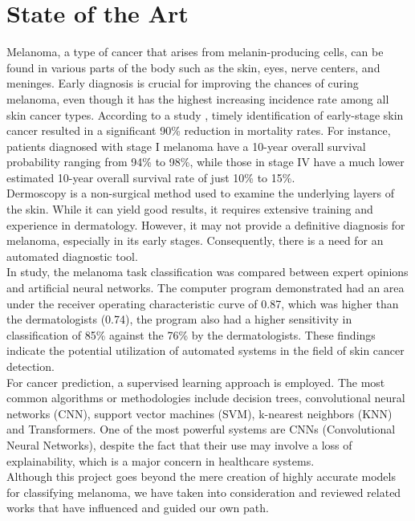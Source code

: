 \chapter{State of the Art}
\label{cap:estat}

Melanoma, a type of cancer that arises from melanin-producing cells, can be
found in various parts of the body such as the skin, eyes, nerve centers, and
meninges. Early diagnosis is crucial for improving the chances of curing
melanoma, even though it has the highest increasing incidence rate among all
skin cancer types. According to a study \cite{TimelyMelanomaDetection}, timely
identification of early-stage skin cancer resulted in a significant 90\%
reduction in mortality rates. For instance, patients diagnosed with stage I
melanoma have a 10-year overall survival probability ranging from 94\% to 98\%,
while those in stage IV have a much lower estimated 10-year overall survival
rate of just 10\% to 15\%. \\

Dermoscopy is a non-surgical method used to examine the underlying layers of
the skin. While it can yield good results, it requires extensive training and
experience in dermatology. However, it may not provide a definitive diagnosis
for melanoma, especially in its early stages. Consequently, there is a need for
an automated diagnostic tool. \\

In \cite{EpidemiologySkinCancer} study, the melanoma task classification was
compared between expert opinions and artificial neural networks. The computer
program demonstrated had an area under the receiver operating characteristic
curve of 0.87, which was higher than the dermatologists (0.74), the program
also had a higher sensitivity in classification of 85\% against the 76\% by the
dermatologists. These findings indicate the potential utilization of automated
systems in the field of skin cancer detection. \\

For cancer prediction, a supervised learning approach is employed. The most
common algorithms or methodologies include decision trees, convolutional neural
networks (CNN), support vector machines (SVM), k-nearest neighbors (KNN) and
Transformers. One of the most powerful systems are CNNs (Convolutional Neural
Networks), despite the fact that their use may involve a loss of
explainability, which is a major concern in healthcare systems. \\

Although this project goes beyond the mere creation of highly accurate models
for classifying melanoma, we have taken into consideration and reviewed related
works that have influenced and guided our own path.

